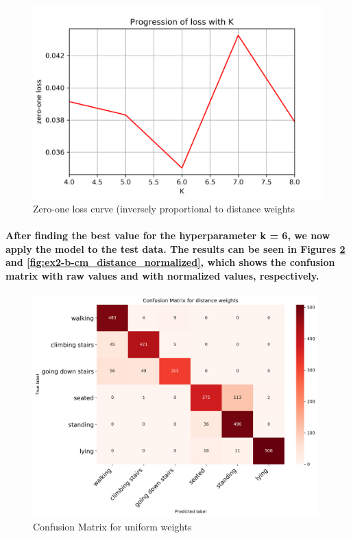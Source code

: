 \documentclass[a4paper]{article}    %
\begin{document}
\begin{figure}[H]
    \centering
    \includegraphics[width=12cm]{error_distance_(zoom)}
    \caption{Zero-one loss curve (inversely proportional to distance weights}
    \label{fig:ex2-b-error_distance_zoom}
\end{figure}

\paragraph{After finding the best value for the hyperparameter k = 6, we now apply the model to the test data. The results can be seen in Figures \ref{fig:ex2-b-cm_distance} and \ref{fig:ex2-b-cm_distance_normalized}, which shows the confusion matrix with raw values and with normalized values, respectively.}

\begin{figure}[H]
    \centering
    \includegraphics[width=11cm]{cm_distance}
    \caption{Confusion Matrix for uniform weights}
    \label{fig:ex2-b-cm_distance}
\end{figure}
\end{document}
